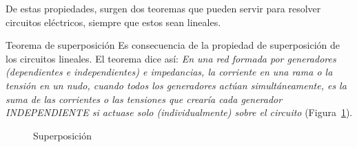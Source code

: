 \documentclass[11pt]{book} %
\makeatletter
\numberwithin{dummy}{section}
\theoremstyle{ocrenumbox}
\theoremstyle{blacknumex}
\theoremstyle{blacknumbox}
\theoremstyle{ocrenum}
\renewcommand{\subsection}{\@startsection {subsection}{2}{\z@}
{-3ex \@plus -0.1ex \@minus -.4ex}
{0.5ex \@plus.2ex }
{\normalfont\sffamily\bfseries}}
\newlength\esp
\makeatother
\begin{document}
    De estas propiedades, surgen dos teoremas que pueden servir para resolver circuitos eléctricos, siempre que estos sean lineales.
    
    \subsection{Teorema de superposición}
    Es consecuencia de la propiedad de superposición de los circuitos lineales. El teorema dice así: \textit{En una red formada por generadores (dependientes e independientes) e impedancias, la corriente en una rama o la tensión en un  nudo, cuando todos los generadores actúan simultáneamente, es la suma de las corrientes o las tensiones que crearía cada generador INDEPENDIENTE si actuase solo (individualmente) sobre el circuito} (Figura~\ref{fig.superposicion}).
    \begin{figure}[htbp]
        \centering
        \hfil
        \caption{Superposición}
        \label{fig.superposicion}
    \end{figure}
    
\end{document}
